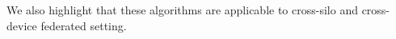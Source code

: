 \documentclass[twoside]{article}
\begin{document}
%
%
We also highlight that these algorithms are  applicable to cross-silo and cross-device federated setting.
\end{document}
